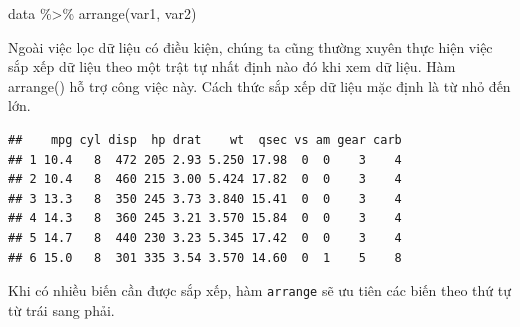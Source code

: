 \documentclass[]{krantz}
\makeatletter
\newenvironment{Shaded}{\begin{snugshade}}{\end{snugshade}}
\newcommand{\KeywordTok}[1]{\textcolor[rgb]{0.27,0.27,0.27}{\textbf{#1}}}
\newcommand{\NormalTok}[1]{#1}
\newcommand{\OperatorTok}[1]{\textcolor[rgb]{0.43,0.43,0.43}{\textbf{#1}}}
\newcommand{\StringTok}[1]{\textcolor[rgb]{0.5,0.5,0.5}{#1}}
\renewenvironment{quote}{\begin{VF}}{\end{VF}}
\newenvironment{kframe}{%
\medskip{}
\setlength{\fboxsep}{.8em}
 \def\at@end@of@kframe{}%
 \ifinner\ifhmode%
  \def\at@end@of@kframe{\end{minipage}}%
  \begin{minipage}{\columnwidth}%
 \fi\fi%
 \def\FrameCommand##1{\hskip\@totalleftmargin \hskip-\fboxsep
 \colorbox{shadecolor}{##1}\hskip-\fboxsep
     \hskip-\linewidth \hskip-\@totalleftmargin \hskip\columnwidth}%
 \MakeFramed {\advance\hsize-\width
   \@totalleftmargin\z@ \linewidth\hsize
   \@setminipage}}%
 {\par\unskip\endMakeFramed%
 \at@end@of@kframe}
\renewenvironment{Shaded}{\begin{kframe}}{\end{kframe}}
\renewenvironment{Shaded}{\begin{snugshade}}{\end{snugshade}}
\renewcommand{\KeywordTok}[1]{\textcolor[rgb]{0.13,0.29,0.53}{\textbf{#1}}}
\renewcommand{\NormalTok}[1]{#1}
\renewcommand{\OperatorTok}[1]{\textcolor[rgb]{0.81,0.36,0.00}{\textbf{#1}}}
\renewcommand{\StringTok}[1]{\textcolor[rgb]{0.31,0.60,0.02}{#1}}
\theoremstyle{definition}
\theoremstyle{definition}
\theoremstyle{definition}
\theoremstyle{remark}
\makeatother
\begin{document}
\begin{quote}
data \%\textgreater{}\% arrange(var1, var2)
\end{quote}

Ngoài việc lọc dữ liệu có điều kiện, chúng ta cũng thường xuyên thực
hiện việc sắp xếp dữ liệu theo một trật tự nhất định nào đó khi xem dữ
liệu. Hàm arrange() hỗ trợ công việc này. Cách thức sắp xếp dữ liệu mặc
định là từ nhỏ đến lớn.

\begin{Shaded}
\end{Shaded}

\begin{verbatim}
##    mpg cyl disp  hp drat    wt  qsec vs am gear carb
## 1 10.4   8  472 205 2.93 5.250 17.98  0  0    3    4
## 2 10.4   8  460 215 3.00 5.424 17.82  0  0    3    4
## 3 13.3   8  350 245 3.73 3.840 15.41  0  0    3    4
## 4 14.3   8  360 245 3.21 3.570 15.84  0  0    3    4
## 5 14.7   8  440 230 3.23 5.345 17.42  0  0    3    4
## 6 15.0   8  301 335 3.54 3.570 14.60  0  1    5    8
\end{verbatim}

Khi có nhiều biến cần được sắp xếp, hàm \texttt{arrange} sẽ ưu tiên các
biến theo thứ tự từ trái sang phải.

\begin{Shaded}
\end{Shaded}
\end{document}

